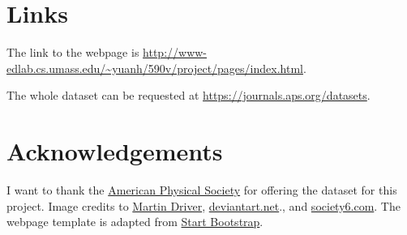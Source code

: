\documentclass{article} %
\begin{document}
\section{Links}
The link to the webpage is \url{http://www-edlab.cs.umass.edu/~yuanh/590v/project/pages/index.html}.

The whole dataset can be requested at \url{https://journals.aps.org/datasets}.

\section{Acknowledgements}
I want to thank the \href{https://journals.aps.org/}{American Physical Society} for offering the dataset for this project. Image credits to \href{https://wallpapersafari.com/w/fKpsS1}{Martin Driver}, \href{http://img15.deviantart.net/b424/i/2013/157/b/f/the_hitchhiker_s_guide_to_the_galaxy_wallpaper_by_lucaszanella-d6821pm.png}{deviantart.net}., and \href{https://society6.com/product/dont-panic-9mv_print#s6-1258355p4a1v45}{society6.com}. The webpage template is adapted from \href{https://startbootstrap.com/}{Start Bootstrap}.
\end{document}
